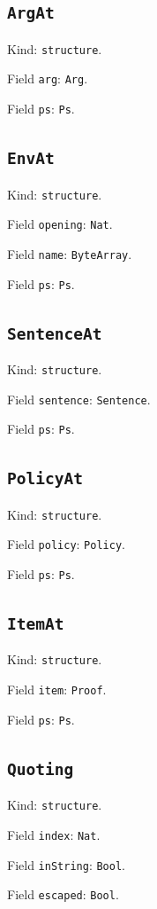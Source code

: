 \documentclass[11pt]{article}
\begin{document}
\subsection*{\texttt{ArgAt}}
\noindent Kind: \texttt{structure}.\par
\noindent Field \texttt{arg}: \texttt{Arg}.\par
\noindent Field \texttt{ps}: \texttt{Ps}.\par
\subsection*{\texttt{EnvAt}}
\noindent Kind: \texttt{structure}.\par
\noindent Field \texttt{opening}: \texttt{Nat}.\par
\noindent Field \texttt{name}: \texttt{ByteArray}.\par
\noindent Field \texttt{ps}: \texttt{Ps}.\par
\subsection*{\texttt{SentenceAt}}
\noindent Kind: \texttt{structure}.\par
\noindent Field \texttt{sentence}: \texttt{Sentence}.\par
\noindent Field \texttt{ps}: \texttt{Ps}.\par
\subsection*{\texttt{PolicyAt}}
\noindent Kind: \texttt{structure}.\par
\noindent Field \texttt{policy}: \texttt{Policy}.\par
\noindent Field \texttt{ps}: \texttt{Ps}.\par
\subsection*{\texttt{ItemAt}}
\noindent Kind: \texttt{structure}.\par
\noindent Field \texttt{item}: \texttt{Proof}.\par
\noindent Field \texttt{ps}: \texttt{Ps}.\par
\subsection*{\texttt{Quoting}}
\noindent Kind: \texttt{structure}.\par
\noindent Field \texttt{index}: \texttt{Nat}.\par
\noindent Field \texttt{inString}: \texttt{Bool}.\par
\noindent Field \texttt{escaped}: \texttt{Bool}.\par
\end{document}

